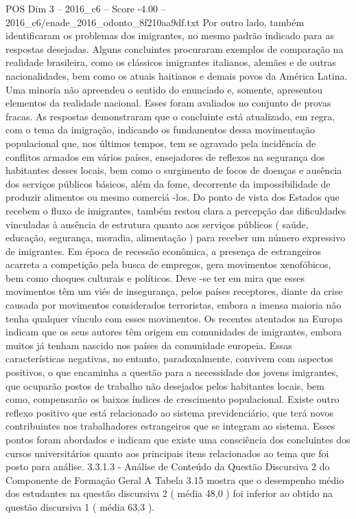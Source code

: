 \begin{textsample}{POS Dim 3 – 2016\_c6 – Score -4.00 – 2016\_c6/enade\_2016\_odonto\_8f210aa9df.txt}
Por outro lado, também identificaram os problemas dos imigrantes, no mesmo padrão indicado para as respostas desejadas.
Alguns concluintes procuraram exemplos de comparação na realidade brasileira, como os clássicos imigrantes italianos, alemães e de outras nacionalidades, bem como os atuais haitianos e demais povos da América Latina.
Uma minoria não apreendeu o sentido do enunciado e, somente, apresentou elementos da realidade nacional.
Esses foram avaliados no conjunto de provas fracas.
As respostas demonstraram que o concluinte está atualizado, em regra, com o tema da imigração, indicando os fundamentos dessa movimentação populacional que, nos últimos tempos, tem se agravado pela incidência de conflitos armados em vários países, ensejadores de reflexos na segurança dos habitantes desses locais, bem como o surgimento de focos de doenças e ausência dos serviços públicos básicos, além da fome, decorrente da impossibilidade de produzir alimentos ou mesmo comerciá -los.
Do ponto de vista dos Estados que recebem o fluxo de imigrantes, também restou clara a percepção das dificuldades vinculadas à ausência de estrutura quanto aos serviços públicos ( saúde, educação, segurança, moradia, alimentação ) para receber um número expressivo de imigrantes.
Em época de recessão econômica, a presença de estrangeiros acarreta a competição pela busca de empregos, gera movimentos xenofóbicos, bem como choques culturais e políticos.
Deve -se ter em mira que esses movimentos têm um viés de insegurança, pelos países receptores, diante da crise causada por movimentos considerados terroristas, embora a imensa maioria não tenha qualquer vínculo com esses movimentos.
Os recentes atentados na Europa indicam que os seus autores têm origem em comunidades de imigrantes, embora muitos já tenham nascido nos países da comunidade europeia.
Essas características negativas, no entanto, paradoxalmente, convivem com aspectos positivos, o que encaminha a questão para a necessidade dos jovens imigrantes, que ocuparão postos de trabalho não desejados pelos habitantes locais, bem como, compensarão os baixos índices de crescimento populacional.
Existe outro reflexo positivo que está relacionado ao sistema previdenciário, que terá novos contribuintes nos trabalhadores estrangeiros que se integram ao sistema.
Esses pontos foram abordados e indicam que existe uma consciência dos concluintes dos cursos universitários quanto aos principais itens relacionados ao tema que foi posto para análise. 3.3.1.3 - Análise de Conteúdo da Questão Discursiva 2 do Componente de Formação Geral A Tabela 3.15 mostra que o desempenho médio dos estudantes na questão discursiva 2 ( média 48,0 ) foi inferior ao obtido na questão discursiva 1 ( média 63,3 ).

\end{textsample}
